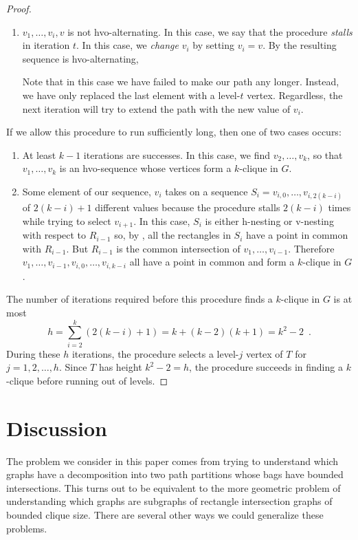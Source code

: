 \documentclass[lotsofwhite]{patmorin}
\begin{document}
\begin{proof}
\begin{enumerate}
     \item $v_1,\ldots,v_i,v$ is not hvo-alternating.  In this case,
       we say that the procedure \emph{stalls} in iteration $t$.
       In this case, we \emph{change} $v_i$ by setting $v_i=v$. By
        the resulting sequence is hvo-alternating,

       Note that in this case we have failed to make our path any
       longer. Instead, we have only replaced the last element with a
       level-$t$ vertex.  Regardless, the next iteration will try to
       extend the path with the new value of $v_i$.
  \end{enumerate}
  If we allow this procedure to run sufficiently long, then one of two
  cases occurs:
  \begin{enumerate}
     \item At least $k-1$ iterations are successes.
     In this case, we find $v_2,\ldots,v_k$, so that $v_1,\ldots,v_k$
     is an hvo-sequence whose vertices form a $k$-clique in $G$.

     \item Some element of our sequence,
     $v_i$ takes on a sequence $S_i=v_{i,0},\ldots,v_{i,2(k-i)}$
     of $2(k-i)+1$ different values because the procedure stalls
     $2(k-i)$ times while trying to select $v_{i+1}$.  In this
     case, $S_i$ is either h-nesting or v-nesting with respect
     to $R_{i-1}$ so, by , all the rectangles in
     $S_i$ have a point in common with $R_{i-1}$.  But $R_{i-1}$
     is the common intersection of $v_1,\ldots,v_{i-1}$.  Therefore
     $v_1,\ldots,v_{i-1},v_{i,0},\ldots,v_{i,k-i}$ all have a point in
     common and form a $k$-clique in $G$.
  \end{enumerate}
  The number of iterations required before this procedure finds
  a $k$-clique in $G$ is at most
  \[
      h = \sum_{i=2}^k (2(k-i)+1) = k + (k-2)(k+1) = k^2-2 \enspace .
  \]
  During these $h$ iterations, the procedure selects a level-$j$ vertex
  of $T$ for $j=1,2,\ldots,h$.  Since $T$ has height $k^2-2 = h$, the 
  procedure succeeds in finding a $k$-clique before running out of levels.
\end{proof}

\section{Discussion}

The problem we consider in this paper comes from trying to understand
which graphs have a decomposition into two path partitions whose bags
have bounded intersections.  This turns out to be equivalent to the
more geometric problem of understanding which graphs are subgraphs of
rectangle intersection graphs of bounded clique size.  There are several
other ways we could generalize these problems.
\end{document}
